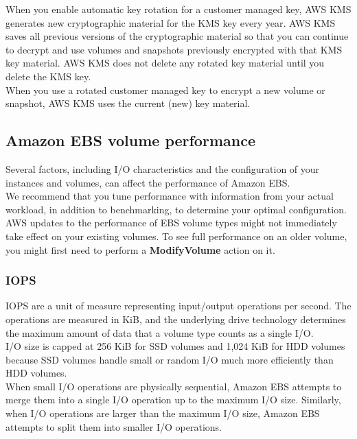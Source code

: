 \documentclass[12pt, letterpaper, twoside]{article}
\begin{document}
When you enable automatic key rotation for a customer managed key, AWS KMS generates new cryptographic material for the KMS key every year. 
AWS KMS saves all previous versions of the cryptographic material so that you can continue to decrypt and use volumes and snapshots previously 
encrypted with that KMS key material. AWS KMS does not delete any rotated key material until you delete the KMS key.\\

When you use a rotated customer managed key to encrypt a new volume or snapshot, AWS KMS uses the current (new) key material.

\subsection{Amazon EBS volume performance}
Several factors, including I/O characteristics and the configuration of your instances and volumes, can affect the performance of Amazon EBS.\\
We recommend that you tune performance with information from your actual workload, in addition to benchmarking, to determine your optimal 
configuration.\\
AWS updates to the performance of EBS volume types might not immediately take effect on your existing volumes. To see full performance on 
an older volume, you might first need to perform a \textbf{ModifyVolume} action on it.\\

\subsubsection{IOPS}
IOPS are a unit of measure representing input/output operations per second. The operations are measured in KiB, and the underlying drive 
technology determines the maximum amount of data that a volume type counts as a single I/O.\\

I/O size is capped at 256 KiB for SSD volumes and 1,024 KiB for HDD volumes because SSD volumes handle small or random I/O much more 
efficiently than HDD volumes.\\

When small I/O operations are physically sequential, Amazon EBS attempts to merge them into a single I/O operation up to the maximum 
I/O size. Similarly, when I/O operations are larger than the maximum I/O size, Amazon EBS attempts to split them into smaller I/O operations.\\
\end{document}
